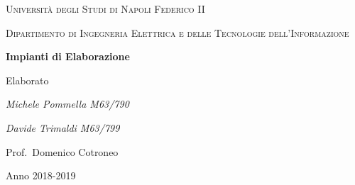 \documentclass[a4paper,12pt]{report}
\begin{document}
	\begin{titlepage}
		\centering
		{\scshape\huge Università degli Studi di Napoli Federico II \par}
		\vspace{1cm}
		{\scshape\large Dipartimento di Ingegneria Elettrica e delle Tecnologie dell'Informazione\par}
		\vspace{0.5cm}
		
		\vspace{1.5cm}
		{\bfseries\huge Impianti di Elaborazione\par}
		\vspace{0.5cm}
		{\ttfamily\Large Elaborato\par}
		\vspace{2cm}
		{\Large\itshape Michele Pommella M63/790\par}
		{\Large\itshape Davide Trimaldi M63/799\par}
		\vspace{1.5cm}
		{\large Prof.~Domenico Cotroneo\par}
		
		\vfill
		
		{\large Anno 2018-2019\par}
	\end{titlepage}

\tableofcontents
\listoffigures







\end{document}

